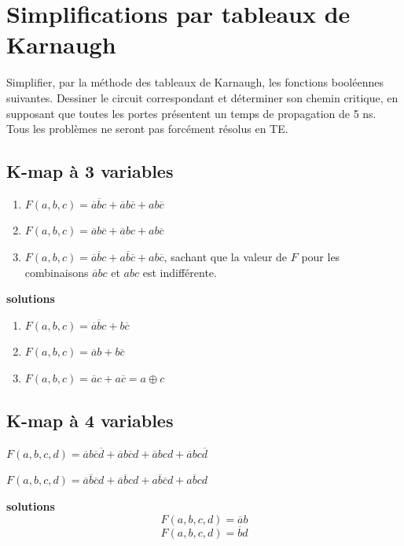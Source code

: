 \documentclass[a4paper,11pt]{article}
\begin{document}
\section{Simplifications par tableaux de Karnaugh}
Simplifier, par la méthode des tableaux de Karnaugh, les fonctions booléennes suivantes. Dessiner le circuit correspondant et déterminer son chemin critique, en supposant que toutes les portes présentent un temps de propagation de 5 ns. Tous les problèmes ne seront pas forcément résolus en TE.

\subsection{K-map à 3 variables}
\begin{enumerate}
\item $F(a,b,c)=\overline{a}\overline{b}c+\overline{a}b\overline{c}+ab\overline{c}$
\item $F(a,b,c)=\overline{a}b\overline{c}+\overline{a}bc+ab\overline{c}$
\item $F(a,b,c)=\overline{a}\overline{b}c+a\overline{b}\overline{c}+ab\overline{c}$, sachant que la valeur de $F$ pour les combinaisons $\overline{a}bc$ et $abc$ est indifférente.
\end{enumerate}
\begin{cadre}

{\bf solutions}
  \begin{enumerate}
  \item $F(a,b,c)=\overline{a}\overline{b}c+b\overline{c}$
  \item $F(a,b,c)=\overline{a}b+b\overline{c}$
  \item $F(a,b,c)=\overline{a}c+a\overline{c}=a\oplus c$
  \end{enumerate}
\end{cadre}

\subsection{K-map à 4 variables}

$F(a,b,c,d)=\overline{a}b\overline{c}\overline{d} +
            \overline{a}b\overline{c}d+
            \overline{a}bcd+
            \overline{a}bc\overline{d}$

$F(a,b,c,d)=\overline{a}\overline{b}\overline{c}d +
            \overline{a}\overline{b}cd +
            a\overline{b}\overline{c}d +
            a\overline{b}cd$
\begin{cadre}
{\bf solutions}
$$F(a,b,c,d)=\overline{a}b$$
$$F(a,b,c,d)=\overline{b}d$$
\end{cadre}
\end{document}
